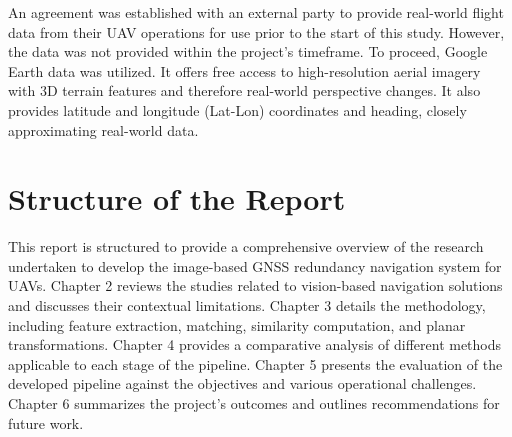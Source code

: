 An agreement was established with an external party to provide real-world flight data from their UAV operations for use prior to the start of this study. However, the data was not provided within the project's timeframe. To proceed, Google Earth data \cite{GoogleEarth} was utilized. It offers free access to high-resolution aerial imagery with 3D terrain features and therefore real-world perspective changes. It also provides latitude and longitude (Lat-Lon) coordinates and heading, closely approximating real-world data.


\section{Structure of the Report}
This report is structured to provide a comprehensive overview of the research undertaken to develop the image-based GNSS redundancy navigation system for UAVs. Chapter 2 reviews the studies related to vision-based navigation solutions and discusses their contextual limitations. Chapter 3 details the methodology, including feature extraction, matching, similarity computation, and planar transformations. Chapter 4 provides a comparative analysis of different methods applicable to each stage of the pipeline. Chapter 5 presents the evaluation of the developed pipeline against the objectives and various operational challenges. Chapter 6 summarizes the project's outcomes and outlines recommendations for future work.



